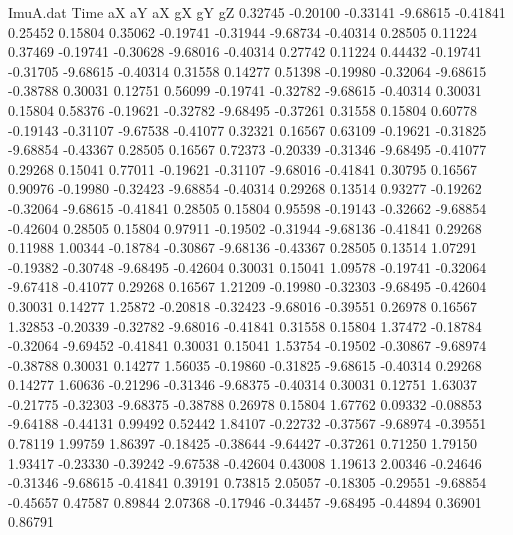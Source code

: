 \begin{filecontents}{ImuA.dat}
Time aX aY aX gX gY gZ
   0.32745   -0.20100   -0.33141   -9.68615   -0.41841    0.25452    0.15804
   0.35062   -0.19741   -0.31944   -9.68734   -0.40314    0.28505    0.11224
   0.37469   -0.19741   -0.30628   -9.68016   -0.40314    0.27742    0.11224
   0.44432   -0.19741   -0.31705   -9.68615   -0.40314    0.31558    0.14277
   0.51398   -0.19980   -0.32064   -9.68615   -0.38788    0.30031    0.12751
   0.56099   -0.19741   -0.32782   -9.68615   -0.40314    0.30031    0.15804
   0.58376   -0.19621   -0.32782   -9.68495   -0.37261    0.31558    0.15804
   0.60778   -0.19143   -0.31107   -9.67538   -0.41077    0.32321    0.16567
   0.63109   -0.19621   -0.31825   -9.68854   -0.43367    0.28505    0.16567
   0.72373   -0.20339   -0.31346   -9.68495   -0.41077    0.29268    0.15041
   0.77011   -0.19621   -0.31107   -9.68016   -0.41841    0.30795    0.16567
   0.90976   -0.19980   -0.32423   -9.68854   -0.40314    0.29268    0.13514
   0.93277   -0.19262   -0.32064   -9.68615   -0.41841    0.28505    0.15804
   0.95598   -0.19143   -0.32662   -9.68854   -0.42604    0.28505    0.15804
   0.97911   -0.19502   -0.31944   -9.68136   -0.41841    0.29268    0.11988
   1.00344   -0.18784   -0.30867   -9.68136   -0.43367    0.28505    0.13514
   1.07291   -0.19382   -0.30748   -9.68495   -0.42604    0.30031    0.15041
   1.09578   -0.19741   -0.32064   -9.67418   -0.41077    0.29268    0.16567
   1.21209   -0.19980   -0.32303   -9.68495   -0.42604    0.30031    0.14277
   1.25872   -0.20818   -0.32423   -9.68016   -0.39551    0.26978    0.16567
   1.32853   -0.20339   -0.32782   -9.68016   -0.41841    0.31558    0.15804
   1.37472   -0.18784   -0.32064   -9.69452   -0.41841    0.30031    0.15041
   1.53754   -0.19502   -0.30867   -9.68974   -0.38788    0.30031    0.14277
   1.56035   -0.19860   -0.31825   -9.68615   -0.40314    0.29268    0.14277
   1.60636   -0.21296   -0.31346   -9.68375   -0.40314    0.30031    0.12751
   1.63037   -0.21775   -0.32303   -9.68375   -0.38788    0.26978    0.15804
   1.67762    0.09332   -0.08853   -9.64188   -0.44131    0.99492    0.52442
   1.84107   -0.22732   -0.37567   -9.68974   -0.39551    0.78119    1.99759
   1.86397   -0.18425   -0.38644   -9.64427   -0.37261    0.71250    1.79150
   1.93417   -0.23330   -0.39242   -9.67538   -0.42604    0.43008    1.19613
   2.00346   -0.24646   -0.31346   -9.68615   -0.41841    0.39191    0.73815
   2.05057   -0.18305   -0.29551   -9.68854   -0.45657    0.47587    0.89844
   2.07368   -0.17946   -0.34457   -9.68495   -0.44894    0.36901    0.86791

\end{filecontents}
